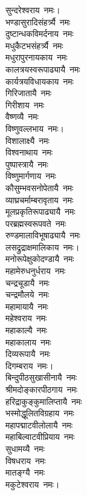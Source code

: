 \begin{multicols}{2}
\begin{flushleft}
सुन्दरेश्वराय~नमः।\hfill{}\\
भण्डासुरादिसंहर्त्र्यै~नमः\\
दुष्टान्धकविमर्दनाय~नमः\\
मधुकैटभसंहर्त्र्यै~नमः\\
मधुरापुरनायकाय~नमः\\
कालत्रयस्वरूपाढ्यायै~नमः\\
कार्यत्रयविधायकाय~नमः\\
गिरिजातायै~नमः\\
गिरीशाय~नमः\\
वैष्णव्यै~नमः\\
विष्णुवल्लभाय~नमः।\hfill{}\\
विशालाक्ष्यै~नमः\\
विश्वनाथाय~नमः\\
पुष्पास्त्रायै~नमः\\
विष्णुमार्गणाय~नमः\\
कौसुम्भवसनोपेतायै~नमः\\
व्याघ्रचर्माम्बरावृताय~नमः\\
मूलप्रकृतिरूपाढ्यायै~नमः\\
परब्रह्मस्वरूपवते~नमः\\
रुण्डमालाविभूषाढ्यायै~नमः\\
लसद्रुद्राक्षमालिकाय~नमः।\hfill{}\\
मनोरूपेक्षुकोदण्डायै~नमः\\
महामेरुधनुर्धराय~नमः\\
चन्द्रचूडायै~नमः\\
चन्द्रमौलये~नमः\\
महामायायै~नमः\\
महेश्वराय~नमः\\
महाकाल्यै~नमः\\
महाकालाय~नमः\\
दिव्यरूपायै~नमः\\
दिगम्बराय~नमः।\hfill{}\\
बिन्दुपीठसुखासीनायै~नमः\\
श्रीमदोङ्कारपीठगाय~नमः\\
हरिद्राकुङ्कुमालिप्तायै~नमः\\
भस्मोद्धूलितविग्रहाय~नमः\\
महापद्माटवीलोलायै~नमः\\
महाबिल्वाटवीप्रियाय~नमः\\
सुधामय्यै~नमः\\
विषधराय~नमः\\
मातङ्ग्यै~नमः\\
मकुटेश्वराय~नमः।\hfill{}\\

\end{flushleft}
\end{multicols}
